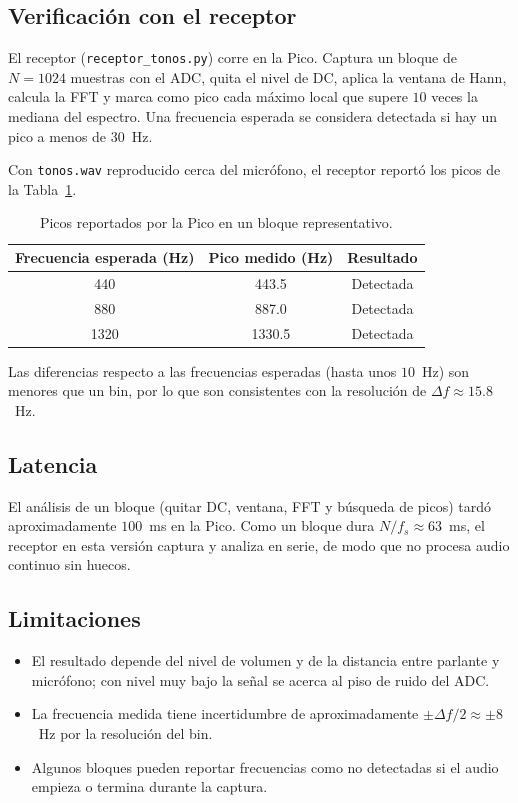 \documentclass[11pt,a4paper]{article}
\begin{document}
\subsection{Verificación con el receptor}
El receptor (\texttt{receptor\_tonos.py}) corre en la Pico. Captura un
bloque de $N=1024$ muestras con el ADC, quita el nivel de DC, aplica la
ventana de Hann, calcula la FFT y marca como pico cada máximo local que
supere $10$ veces la mediana del espectro. Una frecuencia esperada se
considera detectada si hay un pico a menos de $30$~Hz.

Con \texttt{tonos.wav} reproducido cerca del micrófono, el receptor
reportó los picos de la Tabla~\ref{tab:result}.

\begin{table}[h]
  \centering
  \begin{tabular}{ccc}
    \toprule
    Frecuencia esperada (Hz) & Pico medido (Hz) & Resultado \\
    \midrule
    440  & 443.5  & Detectada \\
    880  & 887.0  & Detectada \\
    1320 & 1330.5 & Detectada \\
    \bottomrule
  \end{tabular}
  \caption{Picos reportados por la Pico en un bloque representativo.}
  \label{tab:result}
\end{table}

Las diferencias respecto a las frecuencias esperadas (hasta unos $10$~Hz)
son menores que un bin, por lo que son consistentes con la resolución de
$\Delta f \approx 15.8$~Hz.

\subsection{Latencia}
El análisis de un bloque (quitar DC, ventana, FFT y búsqueda de picos)
tardó aproximadamente $100$~ms en la Pico. Como un bloque dura
$N/f_s \approx 63$~ms, el receptor en esta versión captura y analiza en
serie, de modo que no procesa audio continuo sin huecos.

\subsection{Limitaciones}
\begin{itemize}
  \item El resultado depende del nivel de volumen y de la distancia entre
        parlante y micrófono; con nivel muy bajo la señal se acerca al piso
        de ruido del ADC.
  \item La frecuencia medida tiene incertidumbre de aproximadamente
        $\pm\Delta f/2 \approx \pm 8$~Hz por la resolución del bin.
  \item Algunos bloques pueden reportar frecuencias como no detectadas si
        el audio empieza o termina durante la captura.
\end{itemize}
\end{document}
